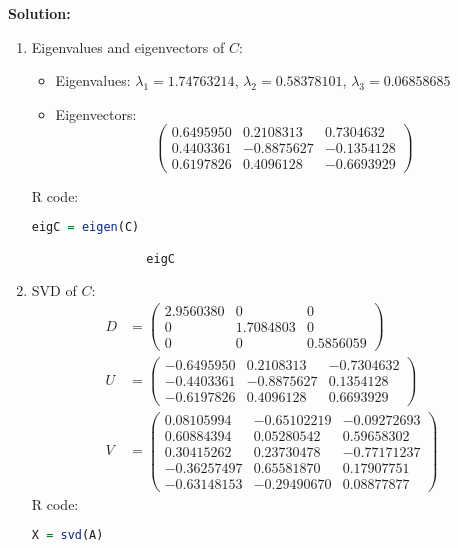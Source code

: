 \documentclass[12pt]{article}
\newenvironment{solution}{
    \textbf{Solution:}
    
}{
    
    \vspace{2em}
}
\begin{document}
\begin{solution}
\begin{enumerate}[label=(\alph*)]
        \item Eigenvalues and eigenvectors of $C$:
            \begin{itemize}
                \item Eigenvalues: $\lambda_1 = 1.74763214$, $\lambda_2 = 0.58378101$, $\lambda_3 = 0.06858685$
                \item Eigenvectors:
                    \[
                    \begin{pmatrix}
                        0.6495950 & 0.2108313 & 0.7304632 \\
                        0.4403361 & -0.8875627 & -0.1354128 \\
                        0.6197826 & 0.4096128 & -0.6693929
                    \end{pmatrix}
                    \]
            \end{itemize}
            R code:
            \begin{lstlisting}[language=R]
                eigC = eigen(C)

                eigC
            \end{lstlisting}
        
        \item SVD of $C$:
        \[
            \begin{aligned}
                D &= \begin{pmatrix}
                    2.9560380  & 0 & 0 \\
                    0 & 1.7084803  & 0 \\
                    0 & 0 & 0.5856059
                \end{pmatrix}\\
                U &= \begin{pmatrix}
                    -0.6495950 & 0.2108313 & -0.7304632 \\
                    -0.4403361 & -0.8875627 & 0.1354128 \\
                    -0.6197826 & 0.4096128 & 0.6693929
                \end{pmatrix}\\
                V &= \begin{pmatrix}
                    0.08105994 & -0.65102219 & -0.09272693 \\
                    0.60884394 & 0.05280542 & 0.59658302 \\
                    0.30415262 & 0.23730478 & -0.77171237 \\
                    -0.36257497 & 0.65581870 & 0.17907751 \\
                    -0.63148153 & -0.29490670 & 0.08877877
                \end{pmatrix}
            \end{aligned}
        \]
        R code:
        \begin{lstlisting}[language=R]
            X = svd(A)


\end{lstlisting}
\end{enumerate}
\end{solution}
\end{document}
